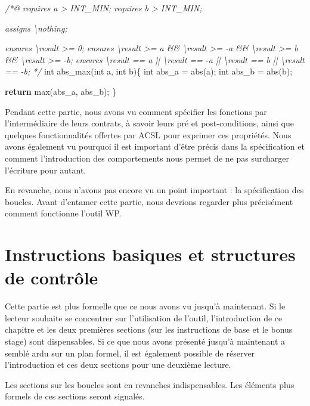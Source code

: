 \documentclass[12pt,francais,]{scrbook}
\newenvironment{Shaded}{}{}
\newcommand{\KeywordTok}[1]{\textcolor[rgb]{0.00,0.44,0.13}{\textbf{{#1}}}}
\newcommand{\DataTypeTok}[1]{\textcolor[rgb]{0.56,0.13,0.00}{{#1}}}
\newcommand{\CommentTok}[1]{\textcolor[rgb]{0.38,0.63,0.69}{\textit{{#1}}}}
\newcommand{\NormalTok}[1]{{#1}}
\newenvironment{zdsblock}[1]{%
  \tcolorbox[beamer,%
    noparskip,breakable,
    colback=LightBlue,colframe=DarkBlue,%
    colbacklower=DarkBlue,%
    title=#1]
}{\endtcolorbox}
\begin{document}
\begin{footnotesize}\begin{Shaded}
\begin{Highlighting}[]
\CommentTok{/*@}
\CommentTok{  requires a > INT_MIN;}
\CommentTok{  requires b > INT_MIN;}

\CommentTok{  assigns \textbackslash{}nothing;}

\CommentTok{  ensures \textbackslash{}result >= 0;}
\CommentTok{  ensures \textbackslash{}result >= a && \textbackslash{}result >= -a && \textbackslash{}result >= b && \textbackslash{}result >= -b;}
\CommentTok{  ensures \textbackslash{}result == a || \textbackslash{}result == -a || \textbackslash{}result == b || \textbackslash{}result == -b;}
\CommentTok{*/}
\DataTypeTok{int} \NormalTok{abs_max(}\DataTypeTok{int} \NormalTok{a, }\DataTypeTok{int} \NormalTok{b)\{}
  \DataTypeTok{int} \NormalTok{abs_a = abs(a);}
  \DataTypeTok{int} \NormalTok{abs_b = abs(b);}

  \KeywordTok{return} \NormalTok{max(abs_a, abs_b);}
\NormalTok{\}}
\end{Highlighting}
\end{Shaded}\end{footnotesize}

Pendant cette partie, nous avons vu comment spécifier les fonctions par
l'intermédiaire de leurs contrats, à savoir leurs pré et
post-conditions, ainsi que quelques fonctionnalités offertes par ACSL
pour exprimer ces propriétés. Nous avons également vu pourquoi il est
important d'être précis dans la spécification et comment l'introduction
des comportements nous permet de ne pas surcharger l'écriture pour
autant.

En revanche, nous n'avons pas encore vu un point important : la
spécification des boucles. Avant d'entamer cette partie, nous devrions
regarder plus précisément comment fonctionne l'outil WP.

\chapter{Instructions basiques et structures de
contrôle}\label{instructions-basiques-et-structures-de-contruxf4le}

\begin{zdsblock}{Information}
  Cette partie est plus formelle que ce
  nous avons vu jusqu'à maintenant. Si le lecteur souhaite se
  concentrer sur l'utilisation de l'outil, l'introduction de ce
  chapitre et les deux premières sections (sur les instructions de base et
  \og{}le bonus stage\fg{}) sont dispensables. Si ce que nous avons
  présenté jusqu'à maintenant a semblé ardu sur un plan
  formel, il est également possible de réserver l'introduction
  et ces deux sections pour une deuxième lecture.
  
  Les sections sur les boucles sont en revanches indispensables. Les
  éléments plus formels de ces sections seront signalés.
\end{zdsblock}
\end{document}
